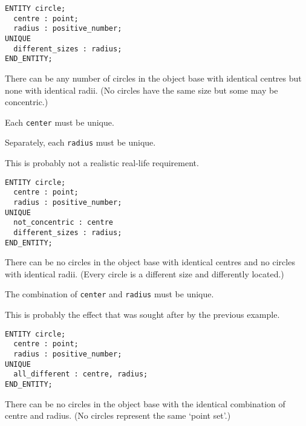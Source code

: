 \clearpage

\begin{verbatim}
ENTITY circle;
  centre : point;
  radius : positive_number;
UNIQUE
  different_sizes : radius;
END_ENTITY;
\end{verbatim}

There can be any number of circles in the object base with identical 
centres but none with identical radii.
(No circles have the same size but some may be concentric.)

\begin{remarks}
\remintro
{}

    Each \texttt{center} must be unique.

    Separately, each \texttt{radius} must be unique.

    This is probably not a realistic real-life requirement.

\remend
\end{remarks}

\clearpage

\begin{verbatim}
ENTITY circle;
  centre : point;
  radius : positive_number;
UNIQUE
  not_concentric : centre
  different_sizes : radius;
END_ENTITY;
\end{verbatim}

There can be no circles in the object base with identical 
centres and no circles with identical radii.
(Every circle is a different size and differently located.)

\begin{remarks}
\remintro
{}

    The combination of \texttt{center} and \texttt{radius} must be unique.

    This is probably the effect that was sought after by the previous example.

\remend
\end{remarks}

\clearpage

\begin{verbatim}
ENTITY circle;
  centre : point;
  radius : positive_number;
UNIQUE
  all_different : centre, radius;
END_ENTITY;
\end{verbatim}

There can be no circles in the object base with the identical 
combination of centre and radius.
(No circles represent the same `point set'.)


